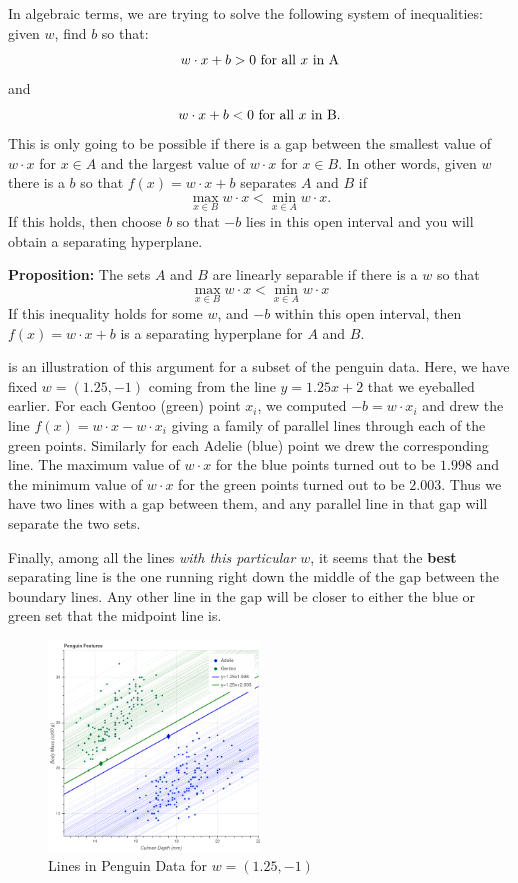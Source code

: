 \documentclass[
  oneside]{scrbook}
\begin{document}
In algebraic terms, we are trying to solve the following system of
inequalities: given \(w\), find \(b\) so that: \[
w\cdot x+b>0 \hbox{ for all $x$ in A}
\] and \[
w\cdot x+b<0\hbox{ for all $x$ in B}.
\] This is only going to be possible if there is a gap between the
smallest value of \(w\cdot x\) for \(x\in A\) and the largest value of
\(w\cdot x\) for \(x\in B\). In other words, given \(w\) there is a
\(b\) so that \(f(x)=w\cdot x+b\) separates \(A\) and \(B\) if \[
\max_{x\in B}w\cdot x < \min_{x\in A} w\cdot x.
\] If this holds, then choose \(b\) so that \(-b\) lies in this open
interval and you will obtain a separating hyperplane.

\textbf{Proposition:} The sets \(A\) and \(B\) are linearly separable if
there is a \(w\) so that \[
\max_{x\in B}w\cdot x < \min_{x\in A} w\cdot x
\] If this inequality holds for some \(w\), and \(-b\) within this open
interval, then \(f(x)=w\cdot x+b\) is a separating hyperplane for \(A\)
and \(B\).

 is an illustration of this argument for a subset
of the penguin data. Here, we have fixed \(w=(1.25,-1)\) coming from the
line \(y=1.25x+2\) that we eyeballed earlier. For each Gentoo (green)
point \(x_{i}\), we computed \(-b=w\cdot x_{i}\) and drew the line
\(f(x) = w\cdot x - w\cdot x_{i}\) giving a family of parallel lines
through each of the green points. Similarly for each Adelie (blue) point
we drew the corresponding line. The maximum value of \(w\cdot x\) for
the blue points turned out to be \(1.998\) and the minimum value of
\(w\cdot x\) for the green points turned out to be \(2.003\). Thus we
have two lines with a gap between them, and any parallel line in that
gap will separate the two sets.

Finally, among all the lines \emph{with this particular \(w\)}, it seems
that the \textbf{best} separating line is the one running right down the
middle of the gap between the boundary lines. Any other line in the gap
will be closer to either the blue or green set that the midpoint line
is.

\begin{figure}
\hypertarget{fig:penguinhwy2}{%
\centering
\includegraphics[width=0.5\textwidth,height=\textheight]{img/penguinhwy2.png}
\caption{Lines in Penguin Data for
\(w=(1.25,-1)\)}\label{fig:penguinhwy2}
}
\end{figure}
\end{document}

